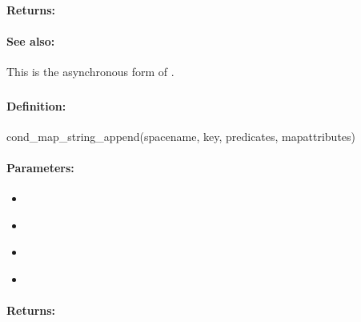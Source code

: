 \paragraph{Returns:}


\paragraph{See also:}  This is the asynchronous form of .

\pagebreak
\subsubsection{}
\label{api:ruby:cond_map_string_append}


\paragraph{Definition:}
\begin{rubycode}
cond_map_string_append(spacename, key, predicates, mapattributes)
\end{rubycode}

\paragraph{Parameters:}
\begin{itemize}[noitemsep]
\item {}\\

\item {}\\

\item {}\\

\item {}\\

\end{itemize}

\paragraph{Returns:}


